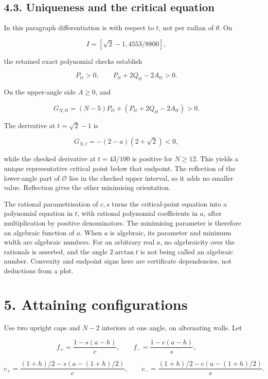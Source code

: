 \documentclass[
  11pt,
  a4paper,
]{article}
\begin{document}
\subsection{4.3. Uniqueness and the critical
equation}\label{uniqueness-and-the-critical-equation}

In this paragraph differentiation is with respect to \textbf{\(t\)}, not
per radian of \(\theta\). On

\[
I=[\sqrt2-1,4553/8800],
\]

the retained exact polynomial checks establish

\[
P_{tt}>0,\qquad P_{tt}+2Q_{tt}-2A_{tt}>0.
\]

On the upper-angle side \(A\ge0\), and

\[
G_{N,tt}=(N-5)P_{tt}+(P_{tt}+2Q_{tt}-2A_{tt})>0.
\]

The derivative at \(t=\sqrt2-1\) is

\[
G_{N,t}=-(2-a)(2+\sqrt2)<0,
\]

while the checked derivative at \(t=43/100\) is positive for \(N\ge12\).
This yields a unique representative critical point below that endpoint.
The reflection of the lower-angle part of \(\mathcal O\) lies in the
checked upper interval, so it adds no smaller value. Reflection gives
the other minimising orientation.

The rational parametrisation of \(c,s\) turns the critical-point
equation into a polynomial equation in \(t\), with rational polynomial
coefficients in \(a\), after multiplication by positive denominators.
The minimising parameter is therefore an algebraic function of \(a\).
When \(a\) is algebraic, its parameter and minimum width are algebraic
numbers. For an arbitrary real \(a\), no algebraicity over the rationals
is asserted, and the angle \(2\arctan t\) is not being called an
algebraic number. Convexity and endpoint signs here are certificate
dependencies, not deductions from a plot.

\section{5. Attaining configurations}\label{attaining-configurations}

Use two upright caps and \(N-2\) interiors at one angle, on alternating
walls. Let

\[
f_+=\frac{1-s(a-h)}c,\qquad
f_-=\frac{1-c(a-h)}s,
\]

\[
c_+=\frac{(1+h)/2-s(a-(1+h)/2)}c,\qquad
c_-=\frac{(1+h)/2-c(a-(1+h)/2)}s.
\]
\end{document}
